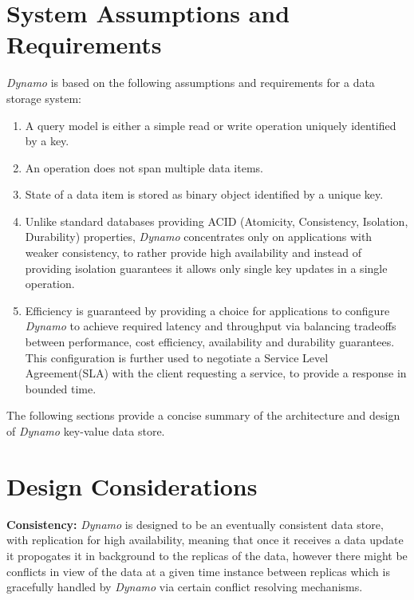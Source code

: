 \documentclass[12pt, a4paper]{article}
\begin{document}
\section*{System Assumptions and Requirements}
\textit{Dynamo}\cite{DeCandia:2007:DAH:1294261.1294281} is based on the following assumptions and requirements for a data storage system:
\begin{enumerate}
        \setlength\itemsep{0em}
        \item A query model is either a simple read or write operation uniquely identified by a key.
        \item An operation does not span multiple data items.
        \item State of a data item is stored as binary object identified by a unique key.
        \item Unlike standard databases providing ACID (Atomicity, Consistency, Isolation, Durability) properties, \textit{Dynamo}\cite{DeCandia:2007:DAH:1294261.1294281} concentrates only on applications with weaker consistency, to rather provide high availability and instead of providing isolation guarantees it allows only single key updates in a single operation.
        \item Efficiency is guaranteed by providing a choice for applications to configure \textit{Dynamo}\cite{DeCandia:2007:DAH:1294261.1294281} to achieve required latency and throughput via balancing tradeoffs between performance, cost efficiency, availability and durability guarantees. This configuration is further used to negotiate a Service Level Agreement(SLA) with the client requesting a service, to provide a response in bounded time.
\end{enumerate}

The following sections provide a concise summary of the architecture and design of \textit{Dynamo}\cite{DeCandia:2007:DAH:1294261.1294281} key-value data store.

\section*{Design Considerations}
\textbf{Consistency:} \textit{Dynamo}\cite{DeCandia:2007:DAH:1294261.1294281} is designed to be an eventually consistent data store, with replication for high availability, meaning that once it receives a data update it propogates it in background to the replicas of the data, however there might be conflicts in view of the data at a given time instance between replicas which is gracefully handled by \textit{Dynamo}\cite{DeCandia:2007:DAH:1294261.1294281} via certain conflict resolving mechanisms.\par
\end{document}
